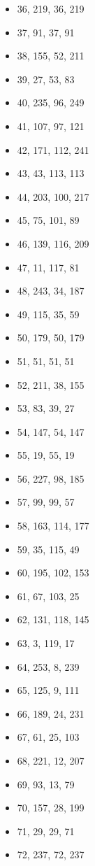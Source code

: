 \documentclass[12pt, fleqn]{report}                             %
\theoremstyle{break}                                            %
\begin{document}
\begin{itemize}
        \item 36, 219, 36, 219
        \item 37, 91, 37, 91
        \item 38, 155, 52, 211
        \item 39, 27, 53, 83
        \item 40, 235, 96, 249
        \item 41, 107, 97, 121
        \item 42, 171, 112, 241
        \item 43, 43, 113, 113
        \item 44, 203, 100, 217
        \item 45, 75, 101, 89
        \item 46, 139, 116, 209
        \item 47, 11, 117, 81
        \item 48, 243, 34, 187
        \item 49, 115, 35, 59
        \item 50, 179, 50, 179
        \item 51, 51, 51, 51
        \item 52, 211, 38, 155
        \item 53, 83, 39, 27
        \item 54, 147, 54, 147
        \item 55, 19, 55, 19
        \item 56, 227, 98, 185
        \item 57, 99, 99, 57
        \item 58, 163, 114, 177
        \item 59, 35, 115, 49
        \item 60, 195, 102, 153
        \item 61, 67, 103, 25
        \item 62, 131, 118, 145
        \item 63, 3, 119, 17
        \item 64, 253, 8, 239
        \item 65, 125, 9, 111
        \item 66, 189, 24, 231
        \item 67, 61, 25, 103
        \item 68, 221, 12, 207
        \item 69, 93, 13, 79
        \item 70, 157, 28, 199
        \item 71, 29, 29, 71
        \item 72, 237, 72, 237

\end{itemize}
\end{document}
